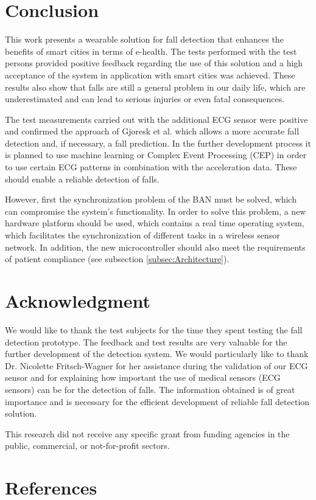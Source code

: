 \documentclass[review]{elsarticle}
\begin{document}
\section{Conclusion}
\label{sec:conclusion}
This work presents a wearable solution for fall detection that enhances the benefits of smart cities in terms of e-health. The tests performed with the test persons provided positive feedback regarding the use of this solution and a high acceptance of the system in application with smart cities was achieved. These results also show that falls are still a general problem in our daily life, which are underestimated and can lead to serious injuries or even fatal consequences. 

The test measurements carried out with the additional ECG sensor were positive and confirmed the approach of Gjoresk et al. \cite{Gjoreski2014} which allows a more accurate fall detection and, if necessary, a fall prediction. In the further development process it is planned to use machine learning or Complex Event Processing (CEP) in order to use certain ECG patterns in combination with the acceleration data. These should enable a reliable detection of falls.

However, first the synchronization problem of the BAN must be solved, which can compromise the system's functionality. In order to solve this problem, a new hardware platform should be used, which contains a real time operating system, which facilitates the synchronization of different tasks in a wireless sensor network. In addition, the new microcontroller should also meet the requirements of patient compliance (see subsection \ref{subsec:Architecture}).



\section*{Acknowledgment}
We would like to thank the test subjects for the time they spent testing the fall detection prototype. The feedback and test results are very valuable for the further development of the detection system. We would particularly like to thank Dr. Nicolette Fritsch-Wagner for her assistance during the validation of our ECG sensor and for explaining how important the use of medical sensors (ECG sensors) can be for the detection of falls. The information obtained is of great importance and is necessary for the efficient development of reliable fall detection solution. 

This research did not receive any specific grant from funding agencies in the public, commercial, or not-for-profit sectors.


\section*{References}


\end{document}
